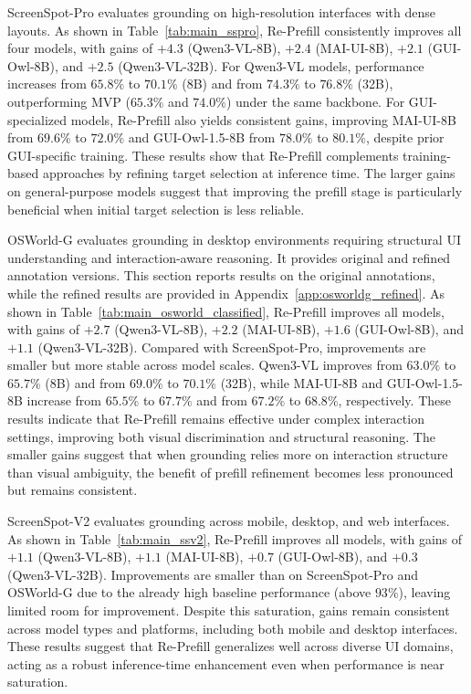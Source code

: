 \documentclass{article}
\begin{document}
ScreenSpot-Pro evaluates grounding on high-resolution interfaces with dense layouts.
As shown in Table~\ref{tab:main_sspro}, Re-Prefill consistently improves all four models, with gains of $+4.3$ (Qwen3-VL-8B), $+2.4$ (MAI-UI-8B), $+2.1$ (GUI-Owl-8B), and $+2.5$ (Qwen3-VL-32B).
For Qwen3-VL models, performance increases from $65.8\%$ to $70.1\%$ (8B) and from $74.3\%$ to $76.8\%$ (32B), outperforming MVP ($65.3\%$ and $74.0\%$) under the same backbone.
For GUI-specialized models, Re-Prefill also yields consistent gains, improving MAI-UI-8B from $69.6\%$ to $72.0\%$ and GUI-Owl-1.5-8B from $78.0\%$ to $80.1\%$, despite prior GUI-specific training.
These results show that Re-Prefill complements training-based approaches by refining target selection at inference time.
The larger gains on general-purpose models suggest that improving the prefill stage is particularly beneficial when initial target selection is less reliable.

OSWorld-G evaluates grounding in desktop environments requiring structural UI understanding and interaction-aware reasoning. It provides original and refined annotation versions. This section reports results on the original annotations, while the refined results are provided in Appendix~\ref{app:osworldg_refined}.
As shown in Table~\ref{tab:main_osworld_classified}, Re-Prefill improves all models, with gains of $+2.7$ (Qwen3-VL-8B), $+2.2$ (MAI-UI-8B), $+1.6$ (GUI-Owl-8B), and $+1.1$ (Qwen3-VL-32B).
Compared with ScreenSpot-Pro, improvements are smaller but more stable across model scales.
Qwen3-VL improves from $63.0\%$ to $65.7\%$ (8B) and from $69.0\%$ to $70.1\%$ (32B), while MAI-UI-8B and GUI-Owl-1.5-8B increase from $65.5\%$ to $67.7\%$ and from $67.2\%$ to $68.8\%$, respectively.
These results indicate that Re-Prefill remains effective under complex interaction settings, improving both visual discrimination and structural reasoning.
The smaller gains suggest that when grounding relies more on interaction structure than visual ambiguity, the benefit of prefill refinement becomes less pronounced but remains consistent.

ScreenSpot-V2 evaluates grounding across mobile, desktop, and web interfaces.
As shown in Table~\ref{tab:main_ssv2}, Re-Prefill improves all models, with gains of $+1.1$ (Qwen3-VL-8B), $+1.1$ (MAI-UI-8B), $+0.7$ (GUI-Owl-8B), and $+0.3$ (Qwen3-VL-32B).
Improvements are smaller than on ScreenSpot-Pro and OSWorld-G due to the already high baseline performance (above $93\%$), leaving limited room for improvement.
Despite this saturation, gains remain consistent across model types and platforms, including both mobile and desktop interfaces.
These results suggest that Re-Prefill generalizes well across diverse UI domains, acting as a robust inference-time enhancement even when performance is near saturation.
\end{document}
